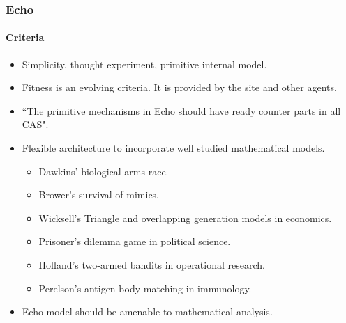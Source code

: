 \frame
{
	\frametitle{Echo}
	\framesubtitle{Criteria}

	\begin{itemize}
		\item Simplicity, thought experiment, primitive internal model.
		\item Fitness is an evolving criteria. It is provided by the site and other agents.
		\item ``The primitive mechanisms in Echo should have ready counter parts in all CAS".
		\item Flexible architecture to incorporate well studied mathematical models.
		\begin{itemize}
			\item Dawkins' biological arms race.
			\item Brower's survival of mimics.
			\item Wicksell's Triangle and overlapping generation models in economics.
			\item Prisoner's dilemma game in political science.
			\item Holland's two-armed bandits in operational research.
			\item Perelson's antigen-body matching in immunology.
		\end{itemize}
		\item Echo model should be amenable to mathematical analysis.
	\end{itemize}
}